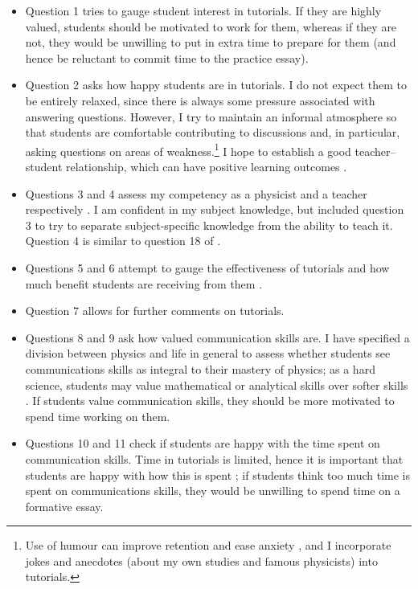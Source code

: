 \begin{itemize}
\item Question 1 tries to gauge student interest in tutorials. If they are highly valued, students should be motivated to work for them, whereas if they are not, they would be unwilling to put in extra time to prepare for them (and hence be reluctant to commit time to the practice essay).
\item Question 2 asks how happy students are in tutorials. I do not expect them to be entirely relaxed, since there is always some pressure associated with answering questions. However, I try to maintain an informal atmosphere so that students are comfortable contributing to discussions and, in particular, asking questions on areas of weakness.\footnote{Use of humour can improve retention and ease anxiety \citep[e.g.,][and references therein]{Korobkin1988,Lesser2008}, and I incorporate jokes and anecdotes (about my own studies and famous physicists) into tutorials.} I hope to establish a good teacher--student relationship, which can have positive learning outcomes \citep{Cornelius-White2007}.
\item Questions 3 and 4 assess my competency as a physicist and a teacher respectively \citep[cf.][figure 4.15, section A]{Brown1988}. I am confident in my subject knowledge, but included question 3 to try to separate subject-specific knowledge from the ability to teach it. Question 4 is similar to question 18 of \citet[appendix]{Ramsden1992}.
\item Questions 5 and 6 attempt to gauge the effectiveness of tutorials and how much benefit students are receiving from them \citep[cf.][figure 4.15, section B]{Brown1988}.
\item Question 7 allows for further comments on tutorials.
\item Questions 8 and 9 ask how valued communication skills are. I have specified a division between physics and life in general to assess whether students see communications skills as integral to their mastery of physics; as a hard science, students may value mathematical or analytical skills over softer skills \citep[cf.][figure 5.4]{Kolb1984}. If students value communication skills, they should be more motivated to spend time working on them.
\item Questions 10 and 11 check if students are happy with the time spent on communication skills. Time in tutorials is limited, hence it is important that students are happy with how this is spent \citep[cf.][appendix, question 30]{Ramsden1992}; if students think too much time is spent on communications skills, they would be unwilling to spend time on a formative essay.

\end{itemize}
